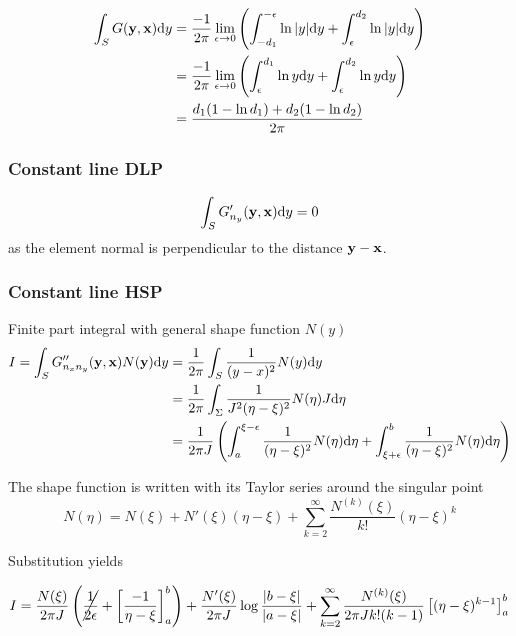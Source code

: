\documentclass[a4paper,11pt]{article}
\newcommand{\td}{\mathrm{d}}
\begin{document}
\begin{align}
\int_{S} G({\bf y}, {\bf x}) \td y
& = \frac{-1}{2\pi}\lim_{\epsilon \to 0}
\left( \int_{-d_1}^{-\epsilon} \ln |y| \td y + \int_{\epsilon}^{d_2}  \ln |y| \td y \right) \nonumber \\
& = \frac{-1}{2\pi}\lim_{\epsilon \to 0}
\left( \int_{\epsilon}^{d_1} \ln y \td y + \int_{\epsilon}^{d_2}  \ln y \td y \right) \nonumber \\
&=
\frac{d_1(1-\ln d_1) + d_2(1-\ln d_2)}{2\pi}
\end{align}

\subsubsection{Constant line DLP}

\begin{equation}
\int_{S} G'_{n_y}({\bf y}, {\bf x}) \td y = 0
\end{equation}
%
as the element normal is perpendicular to the distance ${\bf y}-{\bf x}$.

\subsubsection{Constant line HSP}


Finite part integral with general shape function $N(y)$
%
\begin{align}
	I = \int_S G''_{n_x n_y}({\bf y}, {\bf x}) N({\bf y}) \td y
	&= \frac{1}{2\pi} \int_S \frac{1}{(y-x)^2} N(y) \td y \\
	&= \frac{1}{2\pi} \int_\Sigma \frac{1}{J^2 (\eta-\xi)^2} N(\eta) J \td \eta \\
	&= \frac{1}{2\pi J} \left(
		\int_a^{\xi-\epsilon} \frac{1}{(\eta-\xi)^2} N(\eta) \td \eta
		+ \int_{\xi+\epsilon}^{b} \frac{1}{(\eta-\xi)^2} N(\eta) \td \eta
	\right)
\end{align}

The shape function is written with its Taylor series around the singular point
%
\begin{equation}
	N(\eta) = N(\xi) + N'(\xi) (\eta-\xi) + \sum_{k=2}^{\infty} \frac{N^{(k)}(\xi)}{k!}(\eta-\xi)^k
\end{equation}

Substitution yields

\begin{equation}
	I = \frac{N(\xi)}{2\pi J} \left(
		\cancel{\frac{1}{2\epsilon}} + \left[ \frac{-1}{\eta-\xi} \right]_{a}^{b} 
	\right)
	+
	\frac{N'(\xi)}{2\pi J} \log \frac{|b-\xi|}{|a-\xi|}
	+ \sum_{k=2}^{\infty} \frac{N^{(k)}(\xi)}{2\pi J k! (k-1)}
		\left[ (\eta-\xi)^{k-1} \right]_{a}^{b} 
\end{equation}
\end{document}
